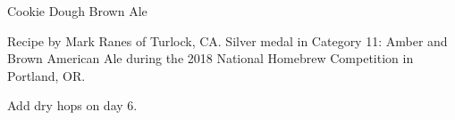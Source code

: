 \begin{recipe}{Cookie Dough Brown Ale}

\begin{aboutblock}
Recipe by Mark Ranes of Turlock, CA. Silver medal in Category 11: Amber and Brown
American Ale during the 2018 National Homebrew Competition in Portland, OR.
\sourceaha
\end{aboutblock}


\begin{methodandtiming}

\begin{mashsteps}
\end{mashsteps}

\begin{fermentationsteps}
\end{fermentationsteps}

\begin{directions}
Add dry hops on day 6.
\end{directions}

\end{methodandtiming}

\recipebreak

\begin{ingredientsblock}

\begin{malts}
\end{malts}

\begin{hops}
\end{hops}


\end{ingredientsblock}

\end{recipe}

